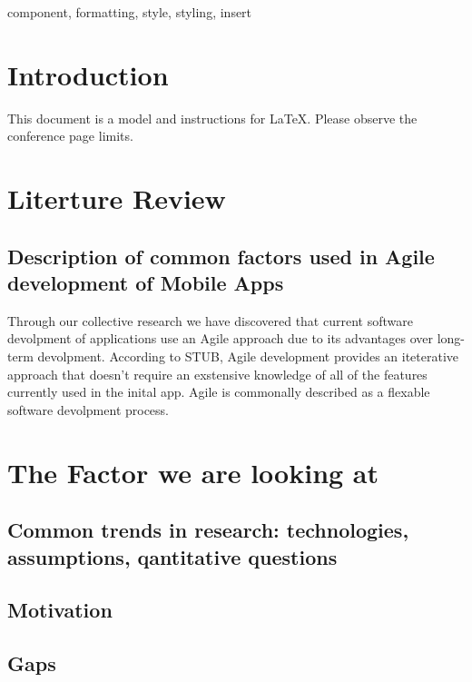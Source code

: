 \documentclass[conference]{IEEEtran}
\begin{document}
\begin{IEEEkeywords}
component, formatting, style, styling, insert
\end{IEEEkeywords}

\section{Introduction}
This document is a model and instructions for \LaTeX.
Please observe the conference page limits. 

\section{Literture Review}

\subsection{Description of common factors used in Agile development of Mobile Apps}
Through our collective research we have discovered that current software devolpment of applications
use an Agile approach due to its advantages over long-term devolpment. According to STUB,
Agile development provides an iteterative approach that doesn't require an exstensive knowledge of 
all of the features currently used in the inital app. Agile is commonally described as a flexable software
devolpment process.  

\section{The Factor we are looking at}


\subsection{Common trends in research: technologies, assumptions, qantitative questions}\label{AA}


\subsection{Motivation}


\subsection{Gaps}
\end{document}
